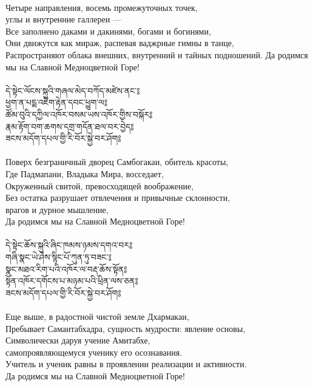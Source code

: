 \\
Четыре направления, восемь промежуточных точек, \\ \indent углы и внутренние галлереи —\\
Все заполнено даками и дакинями, богами и богинями,\\
Они движутся как мираж, распевая ваджрные гимны в танце,\\
Распространяют облака внешних, внутренний и тайных подношений.
Да родимся мы на Славной Медноцветной Горе!\\
\\
{\ti དེ་སྟེང་ལོངས་སྐུའི་གཞལ་མེད་བཀོད་མཛེས་ནང་༔\\
ཕྱག་ན་པདྨ་འཇིག་རྟེན་དབང་ཕྱུག་ལ༔\\
ཚོམ་བུའི་དཀྱིལ་འཁོར་བསམ་ཡས་འཁོར་གྱིས་བསྐོར༔\\
རྣམ་རྟོག་བག་ཆགས་དགྲ་གདོན་ཐལ་བར་བྱེད༔\\
ཟངས་མདོག་དཔལ་གྱི་རི་བོར་སྐྱེ་བར་ཤོག༔}\\
\\
Поверх безграничный дворец Самбогакаи, обитель красоты,\\
Где Падмапани, Владыка Мира, восседает,\\
Окруженный свитой, превосходящей воображение,\\
Без остатка разрушает отвлечения и привычные склонности, \\ \indent врагов и дурное мышление,\\
Да родимся мы на Славной Медноцветной Горе!\\
\\
\newpage
{\ti དེ་སྟེང་ཆོས་སྐུའི་ཞིང་ཁམས་ཉམས་དགའ་བར༔\\
གཞི་སྣང་ཡེ་ཤེས་སྙིང་པོ་ཀུན་ཏུ་བཟང་༔\\
སྣང་མཐའ་རིག་པའི་འཁོར་ལ་བརྡ་ཆོས་སྟོན༔\\
སྟོན་འཁོར་དགོངས་པ་མཉམ་པའི་ཕྲིན་ལས་ཅན༔\\
ཟངས་མདོག་དཔལ་གྱི་རི་བོར་སྐྱེ་བར་ཤོག༔}\\
\\
\ru
Еще выше, в радостной чистой земле Дхармакаи,\\
Пребывает Самантабхадра, сущность мудрости: явление основы,\\
Символически даруя учение Амитабхе, \\ \indent самопроявляющемуся ученику его осознавания.\\
Учитель и ученик равны в проявлении реализации и активности.\\
Да родимся мы на Славной Медноцветной Горе!\\
